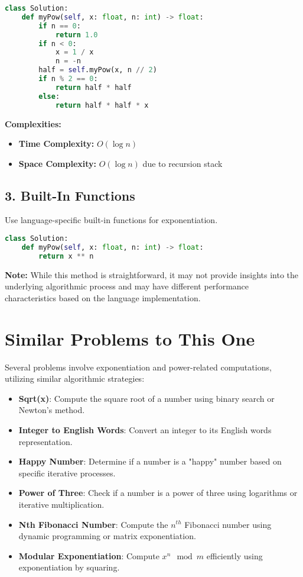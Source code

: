 \begin{lstlisting}[language=Python]
class Solution:
    def myPow(self, x: float, n: int) -> float:
        if n == 0:
            return 1.0
        if n < 0:
            x = 1 / x
            n = -n
        half = self.myPow(x, n // 2)
        if n % 2 == 0:
            return half * half
        else:
            return half * half * x
\end{lstlisting}

\textbf{Complexities:}
\begin{itemize}
    \item \textbf{Time Complexity:} \(O(\log n)\)
    \item \textbf{Space Complexity:} \(O(\log n)\) due to recursion stack
\end{itemize}

\subsection*{3. Built-In Functions}

Use language-specific built-in functions for exponentiation.

\begin{lstlisting}[language=Python]
class Solution:
    def myPow(self, x: float, n: int) -> float:
        return x ** n
\end{lstlisting}

\textbf{Note:} While this method is straightforward, it may not provide insights into the underlying algorithmic process and may have different performance characteristics based on the language implementation.

\section*{Similar Problems to This One}

Several problems involve exponentiation and power-related computations, utilizing similar algorithmic strategies:

\begin{itemize}
    \item \textbf{Sqrt(x)}: Compute the square root of a number using binary search or Newton's method.
    \item \textbf{Integer to English Words}: Convert an integer to its English words representation.
    \item \textbf{Happy Number}: Determine if a number is a "happy" number based on specific iterative processes.
    \item \textbf{Power of Three}: Check if a number is a power of three using logarithms or iterative multiplication.
    \item \textbf{Nth Fibonacci Number}: Compute the \(n^{th}\) Fibonacci number using dynamic programming or matrix exponentiation.
    \item \textbf{Modular Exponentiation}: Compute \(x^n \mod m\) efficiently using exponentiation by squaring.
\end{itemize}

